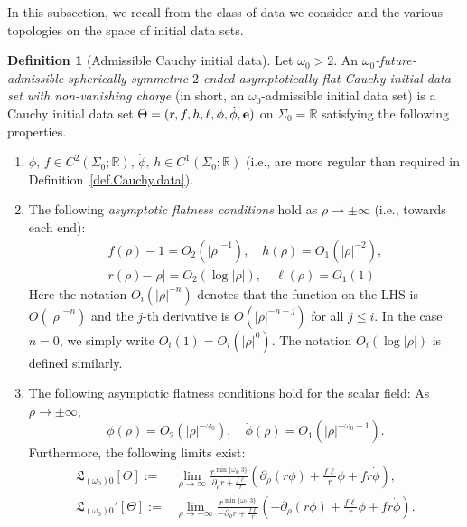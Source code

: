 \documentclass[10pt, reqno]{amsart}
\theoremstyle{definition}
\newtheorem{definition}[theorem]{Definition}
\theoremstyle{remark}
\theoremstyle{conjecture}
\numberwithin{equation}{section}
\newcommand{\abs}[1]{\vert#1\vert}
\newcommand{\set}[1]{\{#1\}}
\newcommand{\rd}{\partial}
\newcommand{\0}{\emptyset}
\newcommand{\Sgm}{\Sigma}
\newcommand{\Tht}{\Theta}
\newcommand{\omg}{\omega}
\newcommand{\bfe}{{\bf e}}
\newcommand{\bbR}{\mathbb R}
\newcommand{\e}{\bfe}							%
\begin{document}
In this subsection, we recall from \cite{LO.interior} the class of data we consider and the various topologies on the space of initial data sets.
\begin{definition} [Admissible Cauchy initial data] \label{def:adm-data}
Let $\omg_{0} > 2$. An \emph{$\omg_{0}$-future-admissible spherically symmetric $2$-ended asymptotically flat Cauchy initial data set with non-vanishing charge} (in short, an $\omg_{0}$-admissible initial data set) is a Cauchy initial data set $\Tht = (r, f, h, \ell, \phi, \dot{\phi}, \e)$ on $\Sgm_{0} = \bbR$ satisfying the following properties.
\begin{enumerate}
\item $\phi,\, f \in C^2(\Sigma_0;\mathbb R)$, $\dot{\phi},\, h \in C^1(\Sigma_0;\mathbb R)$ (i.e., are more regular than required in Definition~\ref{def.Cauchy.data}).
\item The following \emph{asymptotic flatness conditions} hold as $\rho \to \pm\infty$ (i.e., towards each end):
\begin{equation} \label{eq:adm-id-af}
\begin{gathered}
	f(\rho) - 1 = O_{2}(\abs{\rho}^{-1}),\quad
	h(\rho) = O_{1}(\abs{\rho}^{-2}), \\
	r(\rho) - \abs{\rho} = O_{2}(\log \abs{\rho}), \quad
	\ell(\rho) = O_{1}(1)
\end{gathered}
\end{equation}
Here the notation $O_{i}(\abs{\rho}^{-n})$ denotes that the function on the LHS is $O(|\rho|^{-n})$ and the $j$-th derivative is $O(|\rho|^{-n-j})$ for all $j\leq i$. In the case $n = 0$, we simply write $O_{i}(1) = O_{i}(| \rho |^{0})$. The notation $O_{i}(\log \abs{\rho})$ is defined similarly.
\item 
The following asymptotic flatness conditions hold for the scalar field: As $\rho \to \pm \infty$,
\begin{equation} \label{eq:adm-id-phi}
	\phi (\rho) = O_{2}(\abs{\rho}^{-\omg_{0}}), \quad 
	\dot{\phi}(\rho) = O_{1}(\abs{\rho}^{-\omg_{0}-1}). 
\end{equation}
Furthermore, the following limits exist:
\begin{equation} \label{eq:adm-id-limits}
\begin{aligned}
	\mathfrak{L}_{(\omg_{0}) 0}[\Tht] := & \lim_{\rho \to \infty} \frac{r^{\min\set{\omg_{0}, 3}}}{\rd_{\rho} r + \frac{f\ell}{r}} \left(\rd_{\rho} (r \phi) + \frac{f \ell}{r} \phi + f r \dot{\phi} \right), \\ 
	\mathfrak{L}_{(\omg_{0}) 0}'[\Tht] := & \lim_{\rho \to - \infty} \frac{r^{\min\set{\omg_{0}, 3}}}{-\rd_{\rho} r + \frac{f\ell}{r}} \left(-\rd_{\rho} (r \phi) + \frac{f \ell}{r} \phi + f r \dot{\phi} \right).

\end{aligned}
\end{equation}
\end{enumerate}
\end{definition}
\end{document}
